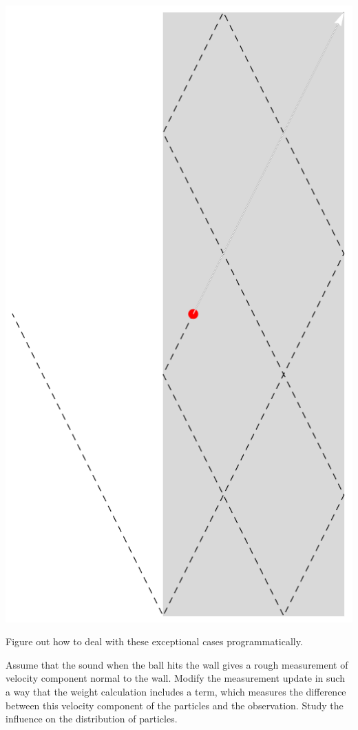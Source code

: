 \documentclass{tstextbook}
\begin{document}
\begin{exercise}
\includegraphics[scale=0.5, center]{images/ball_escapes_box.pdf}

Figure out how to deal with these exceptional cases programmatically.
\end{exercise}

\begin{exercise}
  Assume that the sound when the ball hits the wall gives a rough measurement of velocity component normal to the wall. Modify the measurement update in such a way that the weight calculation includes a term, which measures the difference between this velocity component of the particles and the observation. Study the influence on the distribution of particles.    
\end{exercise}
\end{document}
